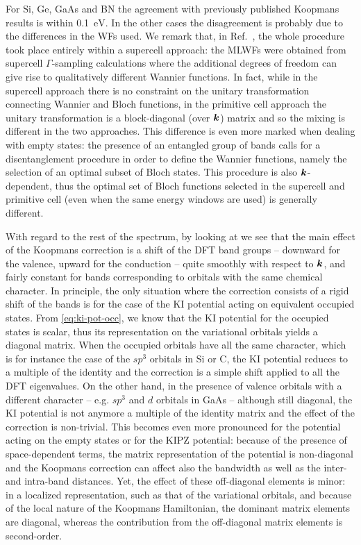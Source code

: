 For Si, Ge, GaAs and BN the agreement with previously published Koopmans results \cite{nguyen_koopmans-compliant_2018} is within 0.1~$\si{\electronvolt}$. In the other cases the disagreement is probably due to the differences in the WFs used. We remark that, in Ref.~\cite{nguyen_koopmans-compliant_2018}, the whole procedure took place entirely within a supercell approach: the MLWFs were obtained from supercell $\Gamma$-sampling calculations where the additional degrees of freedom can give rise to qualitatively different Wannier functions. In fact, while in the supercell approach there is no constraint on the unitary transformation connecting Wannier and Bloch functions, in the primitive cell approach the unitary transformation is a block-diagonal (over ${\bm k}$) matrix and so the mixing is different in the two approaches. This difference is even more marked when dealing with empty states: the presence of an entangled group of bands calls for a disentanglement procedure in order to define the Wannier functions, namely the selection of an optimal subset of Bloch states. This procedure is also ${\bm k}$-dependent, thus the optimal set of Bloch functions selected in the supercell and primitive cell (even when the same energy windows are used) is generally different.

With regard to the rest of the spectrum, by looking at  we see that the main effect of the Koopmans correction is a shift of the DFT band groups -- downward for the valence, upward for the conduction -- quite smoothly with respect to ${\bm k}$, and fairly constant for bands corresponding to orbitals with the same chemical character. In principle, the only situation where the correction consists of a rigid shift of the bands is for the case of the KI potential acting on equivalent occupied states. From \cref{eq:ki-pot-occ}, we know that the KI potential for the occupied states is scalar, thus its representation on the variational orbitals yields a diagonal matrix. When the occupied orbitals have all the same character, which is for instance the case of the $sp^3$ orbitals in Si or C, the KI potential reduces to a multiple of the identity and the correction is a simple shift applied to all the DFT eigenvalues. On the other hand, in the presence of valence orbitals with a different character -- e.g. $sp^3$ and $d$ orbitals in GaAs -- although still diagonal, the KI potential is not anymore a multiple of the identity matrix and the effect of the correction is non-trivial. This becomes even more pronounced for the potential acting on the empty states or for the KIPZ potential: because of the presence of space-dependent terms, the matrix representation of the potential is non-diagonal and the Koopmans correction can affect also the bandwidth as well as the inter- and intra-band distances. Yet, the effect of these off-diagonal elements is minor: in a localized representation, such as that of the variational orbitals, and because of the local nature of the Koopmans Hamiltonian, the dominant matrix elements are diagonal, whereas the contribution from the off-diagonal matrix elements is second-order.

